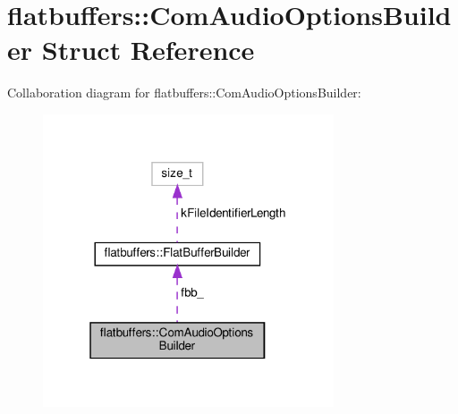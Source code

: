 \hypertarget{structflatbuffers_1_1ComAudioOptionsBuilder}{}\section{flatbuffers\+:\+:Com\+Audio\+Options\+Builder Struct Reference}
\label{structflatbuffers_1_1ComAudioOptionsBuilder}


Collaboration diagram for flatbuffers\+:\+:Com\+Audio\+Options\+Builder\+:
\nopagebreak
\begin{figure}[H]
\begin{center}
\leavevmode
\includegraphics[width=244pt]{structflatbuffers_1_1ComAudioOptionsBuilder__coll__graph}
\end{center}
\end{figure}
